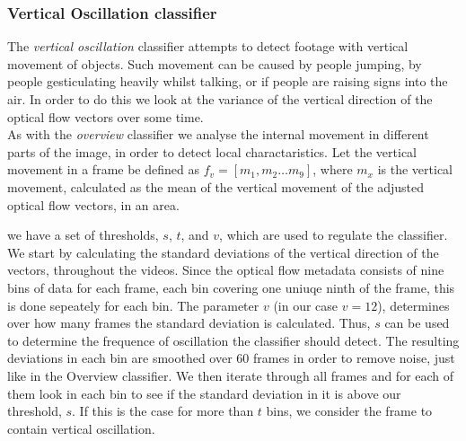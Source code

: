 \subsubsection{Vertical Oscillation classifier}\label{sec:verticaloscillationclassifier}
%
The \textit{vertical oscillation} classifier attempts to detect footage with vertical movement of objects. Such movement can be caused by people jumping, by people gesticulating heavily whilst talking, or if people are raising signs into the air. In order to do this we look at the variance of the vertical direction of the optical flow vectors over some time.\\
As with the \textit{overview} classifier we analyse the internal movement in different parts of the image, in order to detect local charactaristics. Let the vertical movement in a frame be defined as $f_{v} = [m_{1},m_{2} \dots m_{9}]$, where $m_{x}$ is the vertical movement, calculated as the mean of the vertical movement of the adjusted optical flow vectors, in an area.


we have a set of thresholds, $s$, $t$, and $v$, which are used to regulate the classifier. We start by calculating the standard deviations of the vertical direction of the vectors, throughout the videos. Since the optical flow metadata consists of nine bins of data for each frame, each bin covering one uniuqe ninth of the frame, this is done sepeately for each bin. The parameter $v$ (in our case $v = 12$), determines over how many frames the standard deviation is calculated. Thus, $s$ can be used to determine the frequence of oscillation the classifier should detect. The resulting deviations in each bin are smoothed over 60 frames in order to remove noise, just like in the Overview classifier. We then iterate through all frames and for each of them look in each bin to see if the standard deviation in it is above our threshold, $s$. If this is the case for more than $t$ bins, we consider the frame to contain vertical oscillation.
%
%
%
%
